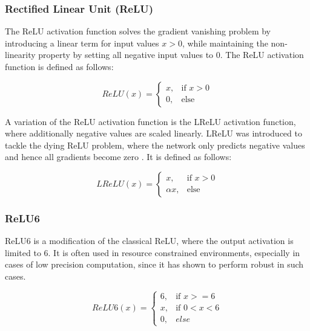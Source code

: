 \subsubsection{Rectified Linear Unit (ReLU)}

The \ac{ReLU} activation function solves the gradient vanishing problem by introducing a linear term for input values $x > 0$, while maintaining the non-linearity property by setting all negative input values to $0$.
The \ac{ReLU} activation function is defined as follows:

\begin{equation}
    ReLU(x) =
    \begin{cases}
        x, & \text{if } x > 0\\
        0, & \text{else}
    \end{cases}
\end{equation}

A variation of the \ac{ReLU} activation function is the \ac{LReLU} activation function, where additionally negative values are scaled linearly.
\ac{LReLU} was introduced to tackle the dying \ac{ReLU} problem, where the network only predicts negative values and hence all gradients become zero \cite{dl}.
It is defined as follows:

\begin{equation}
    LReLU(x) =
    \begin{cases}
        x, & \text{if } x > 0\\
        \alpha x, & \text{else}
    \end{cases}
\end{equation}

\subsubsection{ReLU6}

ReLU6 is a modification of the classical \ac{ReLU}, where the output activation is limited to 6.
It is often used in resource constrained environments, especially in cases of low precision computation, since it has shown to perform robust in such cases. \cite{mnetv1}

\begin{equation}
    ReLU6(x) =
    \begin{cases}
        6, & \text{if } x >= 6\\
        x, & \text{if } 0 < x < 6\\
        0, & else
    \end{cases}
\end{equation}

